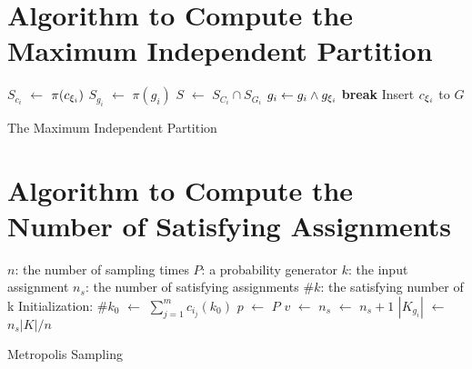
\section{Algorithm to Compute the Maximum Independent Partition}
\label{appendix:partition}


\IncMargin{1em}
\begin{algorithm}[h]
    \DontPrintSemicolon
    {
        $S_{c_i}$ $\leftarrow$ $\pi(c_{{\xi}_{i}})$ \;
        {
            $S_{g_i}$ $\leftarrow$ $\pi(g_{i})$ \;
            $S$ $\leftarrow$ $S_{C_i} \cap S_{G_i}$  \;
            {
                $g_{i} \leftarrow g_{i} \land g_{{\xi}_{i}}$ \;
                \textbf{break} \;
            }
            Insert $c_{{\xi}_{i}}$ to $G$
        }
    }
    \caption{The Maximum Independent Partition}
    \label{algo:max-inde}
\end{algorithm}
\DecMargin{1em}

\section{Algorithm to Compute the Number of Satisfying Assignments}
\label{appendix:montecarlo}

\IncMargin{1em}
\begin{algorithm}
    \SetAlgoLined
    \DontPrintSemicolon


    $n$: the number of sampling times \;
    $P$: a probability generator \;
    $k$: the input assignment \;
    $n_{s}$: the number of satisfying assignments \;
    $\#k$: the satisfying number of k  \;
    Initialization: \;
    $\#{k_0}$ $\leftarrow$ $\sum_{j=1}^{m}c_{i_j}(k_0)$ \;
     {
        $p$ $\leftarrow$ $P$ \;
        {
            $v$ $\leftarrow$  {}
        }
        {$n_{s}$ $\leftarrow$ $n_{s} + 1$}
    }
    $|K_{g_{i}}|$ $\leftarrow$ $n_s|K| / n$
    \caption{Metropolis Sampling}
\end{algorithm}
\DecMargin{1em}

